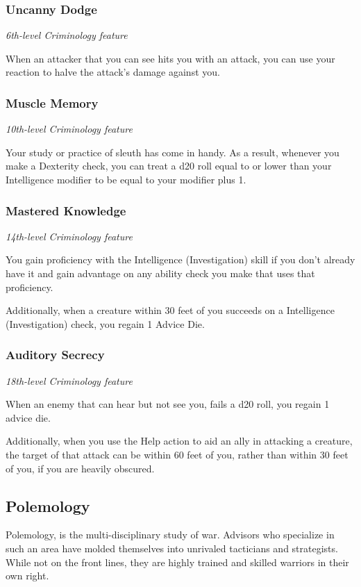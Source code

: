 \documentclass[letterpaper,openany,twoside,twocolumn]{book}
\begin{document}
	\vfill\eject
	
	\subsubsection*{Uncanny Dodge}
	\textnormal{\textit{6th-level Criminology feature}}
	
	When an attacker that you can see hits you with an attack, you can use your reaction to halve the attack's damage against you.
	
	\subsubsection*{Muscle Memory}
	\textnormal{\textit{10th-level Criminology feature}}
	
	Your study or practice of sleuth has come in handy. As a result, whenever you make a Dexterity check, you can treat a d20 roll equal to or lower than your Intelligence modifier to be equal to your modifier plus 1.
	
	\subsubsection*{Mastered Knowledge}
	\textnormal{\textit{14th-level Criminology feature}}
	
	You gain proficiency with the Intelligence (Investigation) skill if you don't already have it and gain advantage on any ability check you make that uses that proficiency.
	
	Additionally, when a creature within 30 feet of you succeeds on a Intelligence (Investigation) check, you regain 1 Advice Die.
	
	\subsubsection*{Auditory Secrecy}
	\textnormal{\textit{18th-level Criminology feature}}
	
	When an enemy that can hear but not see you, fails a d20 roll, you regain 1 advice die.
	
	Additionally, when you use the Help action to aid an ally in attacking a creature, the target of that attack can be within 60 feet of you, rather than within 30 feet of you, if you are heavily obscured.
	\vfill\newpage
	\vspace*{-2.4\fontdimen6\font}
	\subsection*{Polemology}
	Polemology, is the multi-disciplinary study of war. Advisors who specialize in such an area have molded themselves into unrivaled tacticians and strategists. While not on the front lines, they are highly trained and skilled warriors in their own right.
	
\end{document}
